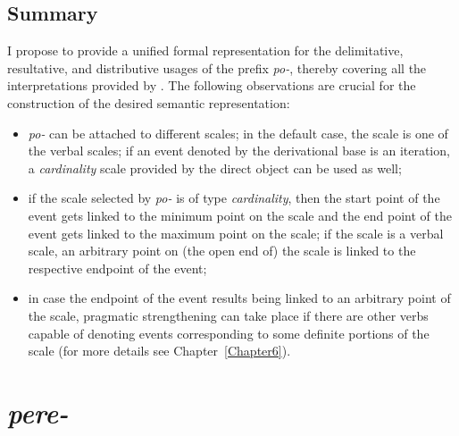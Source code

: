 \subsection{Summary}
I propose to provide a unified formal representation for the delimitative, resultative, and distributive usages of the prefix \textit{po-}, thereby covering all the interpretations provided by \citet{Shvedova:82}. The following observations are crucial for the construction of the desired semantic representation:

\begin{itemize}
\item \textit{po-} can be attached to different scales; in the default case, the scale is one of the verbal scales; if an event denoted by the derivational base is an iteration, a \textit{cardinality} scale provided by the direct object can be used as well;
\item if the scale selected by \textit{po-} is of type \textit{cardinality}, then the start point of the event gets linked to the minimum point on the scale and the end point of the event gets linked to the maximum point on the scale; if the scale is a verbal scale, an arbitrary point on (the open end of) the scale is linked to the respective endpoint of the event;
\item in case the endpoint of the event results being linked to an arbitrary point of the scale, pragmatic strengthening can take place if there are other verbs capable of denoting events corresponding to some definite portions of the scale (for more details see Chapter~\ref{Chapter6}).
\end{itemize}



\section{\textit{pere-}}\label{subsection:semantics:pere}
